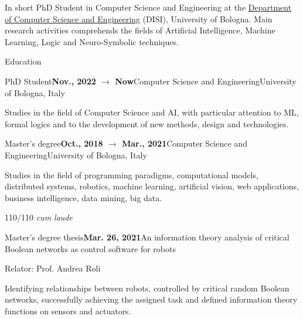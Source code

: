 \documentclass{resume} %
\begin{document}
    
    \begin{rSection}{In short}
        PhD Student in Computer Science and Engineering at the \href{https://disi.unibo.it/it}{Department of Computer Science and Engineering} (DISI), University of Bologna.
        Main research activities comprehends the fields of Artificial Intelligence, Machine Learning, Logic and Neuro-Symbolic techniques.
        
    \end{rSection}
    
    
    \begin{rSection}{Education}
        
        \begin{rSubsection}{PhD Student}{\textbf{Nov., 2022 $\rightarrow$ Now}}{Computer Science and Engineering}{University of Bologna, Italy}
            \item Studies in the field of Computer Science and AI, with particular attention to ML, formal logics and to the development of new methods, design and technologies.
        \end{rSubsection}
        
        
        \begin{rSubsection}{Master's degree}{\textbf{Oct., 2018 $\rightarrow$ Mar., 2021}}{Computer Science and Engineering}{University of Bologna, Italy}
            \item Studies in the field of programming paradigms, computational models, distributed systems, robotics, machine learning, artificial vision, web applications, business intelligence, data mining, big data.
            
            \item 110/110 \emph{cum laude}
        \end{rSubsection}
        \begin{rSubsection}{Master's degree thesis}{\textbf{Mar. 26, 2021}}{An information theory analysis of critical Boolean networks as control software for robots}{\begin{flushright}
                    Relator: Prof. Andrea Roli
            \end{flushright}}
            \item Identifying relationships between robots, controlled by critical random Boolean networks, successfully achieving the assigned task and defined information theory functions on sensors and actuators.
            

\end{rSubsection}
\end{rSection}
\end{document}
